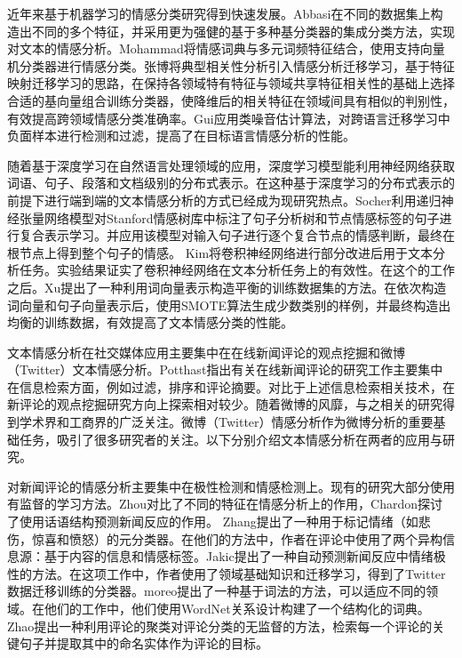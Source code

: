 近年来基于机器学习的情感分类研究得到快速发展。Abbasi在不同的数据集上构造出不同的多个特征，并采用更为强健的基于多种基分类器的集成分类方法，实现对文本的情感分析。Mohammad将情感词典与多元词频特征结合，使用支持向量机分类器进行情感分类。张博将典型相关性分析引入情感分析迁移学习，基于特征映射迁移学习的思路，在保持各领域特有特征与领域共享特征相关性的基础上选择合适的基向量组合训练分类器，使降维后的相关特征在领域间具有相似的判别性，有效提高跨领域情感分类准确率。Gui应用类噪音估计算法，对跨语言迁移学习中负面样本进行检测和过滤，提高了在目标语言情感分析的性能。

随着基于深度学习在自然语言处理领域的应用，深度学习模型能利用神经网络获取词语、句子、段落和文档级别的分布式表示。在这种基于深度学习的分布式表示的前提下进行端到端的文本情感分析的方式已经成为现研究热点。Socher利用递归神经张量网络模型对Stanford情感树库中标注了句子分析树和节点情感标签的句子进行复合表示学习。并应用该模型对输入句子进行逐个复合节点的情感判断，最终在根节点上得到整个句子的情感。 Kim将卷积神经网络进行部分改进后用于文本分析任务。实验结果证实了卷积神经网络在文本分析任务上的有效性。在这个的工作之后。Xu提出了一种利用词向量表示构造平衡的训练数据集的方法。在依次构造词向量和句子向量表示后，使用SMOTE算法生成少数类别的样例，并最终构造出均衡的训练数据，有效提高了文本情感分类的性能。

文本情感分析在社交媒体应用主要集中在在线新闻评论的观点挖掘和微博（Twitter）文本情感分析。Potthast指出有关在线新闻评论的研究工作主要集中在信息检索方面，例如过滤，排序和评论摘要。对比于上述信息检索相关技术，在新评论的观点挖掘研究方向上探索相对较少。随着微博的风靡，与之相关的研究得到学术界和工商界的广泛关注。微博（Twitter）情感分析作为微博分析的重要基础任务，吸引了很多研究者的关注。以下分别介绍文本情感分析在两者的应用与研究。

对新闻评论的情感分析主要集中在极性检测和情感检测上。现有的研究大部分使用有监督的学习方法。Zhou对比了不同的特征在情感分析上的作用，Chardon探讨了使用话语结构预测新闻反应的作用。 Zhang提出了一种用于标记情绪（如悲伤，惊喜和愤怒）的元分类器。在他们的方法中，作者在评论中使用了两个异构信息源：基于内容的信息和情感标签。Jakic提出了一种自动预测新闻反应中情绪极性的方法。在这项工作中，作者使用了领域基础知识和迁移学习，得到了Twitter数据迁移训练的分类器。moreo提出了一种基于词法的方法，可以适应不同的领域。在他们的工作中，他们使用WordNet关系设计构建了一个结构化的词典。 Zhao提出一种利用评论的聚类对评论分类的无监督的方法，检索每一个评论的关键句子并提取其中的命名实体作为评论的目标。

